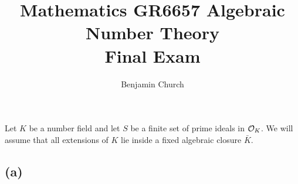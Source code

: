 \documentclass[12pt]{extarticle}
\begin{document}
\title{%
	\large \textbf{Mathematics GR6657 Algebraic Number Theory
	\\ Final Exam} \vspace{-2ex}}
\author{Benjamin Church }
\maketitle
\section{}
Let $K$ be a number field and let $S$ be a finite set of prime ideals in $\mathcal{O}_{K}$. We will assume that all extensions of $K$ lie inside a fixed algebraic closure $\bar{K}$. 

\subsection*{(a)}
\end{document}
